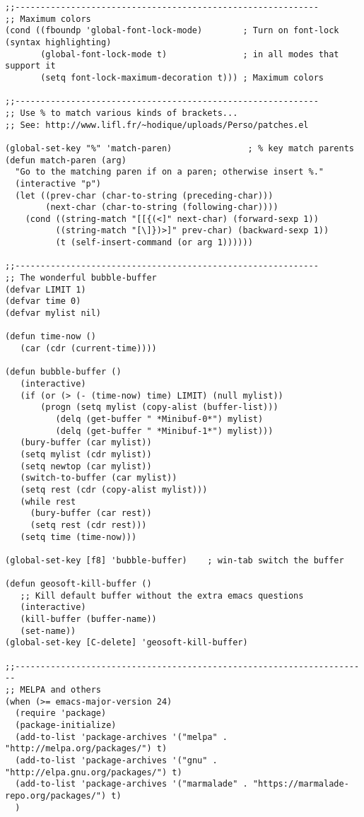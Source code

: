 \documentclass[
  12pt,
  spanish,
]{article}
\begin{document}
\begin{verbatim}
;;------------------------------------------------------------
;; Maximum colors
(cond ((fboundp 'global-font-lock-mode)        ; Turn on font-lock (syntax highlighting)
       (global-font-lock-mode t)               ; in all modes that support it
       (setq font-lock-maximum-decoration t))) ; Maximum colors

;;------------------------------------------------------------
;; Use % to match various kinds of brackets...
;; See: http://www.lifl.fr/~hodique/uploads/Perso/patches.el

(global-set-key "%" 'match-paren)               ; % key match parents
(defun match-paren (arg)
  "Go to the matching paren if on a paren; otherwise insert %."
  (interactive "p")
  (let ((prev-char (char-to-string (preceding-char)))
        (next-char (char-to-string (following-char))))
    (cond ((string-match "[[{(<]" next-char) (forward-sexp 1))
          ((string-match "[\]})>]" prev-char) (backward-sexp 1))
          (t (self-insert-command (or arg 1))))))

;;------------------------------------------------------------
;; The wonderful bubble-buffer
(defvar LIMIT 1)
(defvar time 0)
(defvar mylist nil)

(defun time-now ()
   (car (cdr (current-time))))

(defun bubble-buffer ()
   (interactive)
   (if (or (> (- (time-now) time) LIMIT) (null mylist))
       (progn (setq mylist (copy-alist (buffer-list)))
          (delq (get-buffer " *Minibuf-0*") mylist)
          (delq (get-buffer " *Minibuf-1*") mylist)))
   (bury-buffer (car mylist))
   (setq mylist (cdr mylist))
   (setq newtop (car mylist))
   (switch-to-buffer (car mylist))
   (setq rest (cdr (copy-alist mylist)))
   (while rest
     (bury-buffer (car rest))
     (setq rest (cdr rest)))
   (setq time (time-now)))

(global-set-key [f8] 'bubble-buffer)    ; win-tab switch the buffer

(defun geosoft-kill-buffer ()
   ;; Kill default buffer without the extra emacs questions
   (interactive)
   (kill-buffer (buffer-name))
   (set-name))
(global-set-key [C-delete] 'geosoft-kill-buffer)

;;----------------------------------------------------------------------
;; MELPA and others
(when (>= emacs-major-version 24)
  (require 'package)
  (package-initialize)
  (add-to-list 'package-archives '("melpa" . "http://melpa.org/packages/") t)
  (add-to-list 'package-archives '("gnu" . "http://elpa.gnu.org/packages/") t)
  (add-to-list 'package-archives '("marmalade" . "https://marmalade-repo.org/packages/") t)
  )


\end{verbatim}
\end{document}
